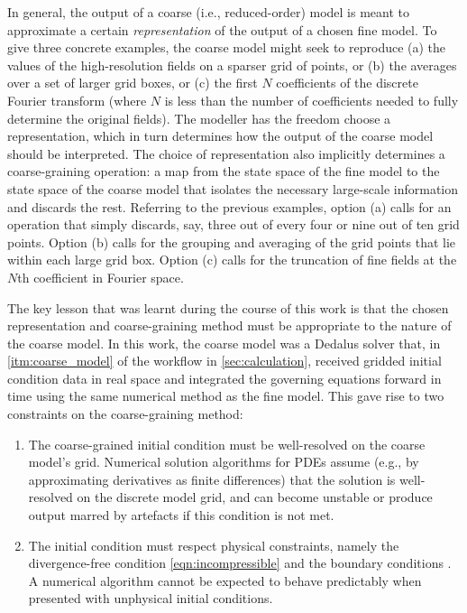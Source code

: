 \documentclass[../main.tex]{subfiles}
\begin{document}
In general, the output of a coarse (i.e., reduced-order) model is meant to
approximate a certain \emph{representation} of the output of a chosen fine
model. To give three concrete examples, the coarse model might seek to
reproduce (a) the values of the high-resolution fields on a sparser grid of
points, or (b) the averages over a set of larger grid boxes, or (c) the first
$N$ coefficients of the discrete Fourier transform (where $N$ is less than the
number of coefficients needed to fully determine the original fields). The
modeller has the freedom choose a representation, which in turn determines how
the output of the coarse model should be interpreted. The choice of
representation also implicitly determines a coarse-graining operation: a map
from the state space of the fine model to the state space of the coarse model
that isolates the necessary large-scale information and discards the rest.
Referring to the previous examples, option (a) calls for an operation that
simply discards, say, three out of every four or nine out of ten grid points.
Option (b) calls for the grouping and averaging of the grid points that lie
within each large grid box. Option (c) calls for the truncation of fine fields
at the $N$th coefficient in Fourier space.

The key lesson that was learnt during the course of this work is that the
chosen representation and coarse-graining method must be appropriate to the
nature of the coarse model. In this work, the coarse model was a Dedalus solver
that, in \cref{itm:coarse_model} of the workflow in \cref{sec:calculation},
received gridded initial condition data in real space and integrated the
governing equations forward in time using the same numerical method as the
fine model. This gave rise to two constraints on the coarse-graining method:
\begin{enumerate}
    \item The coarse-grained initial condition must be well-resolved on the
        coarse model's grid. Numerical solution algorithms for PDEs assume
        (e.g., by approximating derivatives as finite differences) that the
        solution is well-resolved on the discrete model grid, and can become
        unstable or produce output marred by artefacts if this condition is not
        met.
    \item The initial condition must respect physical constraints, namely the
        divergence-free condition \cref{eqn:incompressible} and the boundary
        conditions . A numerical
        algorithm cannot be expected to behave predictably when presented with
        unphysical initial conditions.
\end{enumerate}
\end{document}
